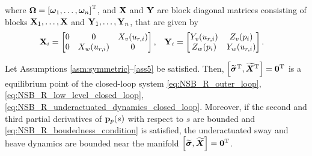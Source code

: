 where $\bm{\Omega} = \left[\bm{\omega}_1, \ldots, \bm{\omega}_n\right]^{\mathrm{T}}$, and $\mathbf{X}$ and $\mathbf{Y}$ are block diagonal matrices consisting of blocks $\mathbf{X}_1, \ldots, \mathbf{X}$ and $\mathbf{Y}_1, \ldots, \mathbf{Y}_n$, that are given by 
\begin{align}
    \mathbf{X}_i &= 
    \begin{bmatrix}
        0 & 0 & X_v(u_{r, i}) \\
        0 & X_w(u_{r, i}) & 0
    \end{bmatrix}, &
    \mathbf{Y}_i &=
    \begin{bmatrix}
        Y_v(u_{r,i}) & Z_v(p_i) \\
        Z_w(p_i) & Y_w(u_{r, i})
    \end{bmatrix}.
\end{align}


\begin{theorem} \label{thm1}
    Let Assumptions \ref{asm:symmetric}--\ref{ass5} be satisfied.
    Then, $\left[\widetilde{\bm{\sigma}}^{\mathrm{T}}, \widetilde{\bm{X}}^{\mathrm{T}}\right] = \mathbf{0}^{\mathrm{T}}$ is a  equilibrium point of the closed-loop system \eqref{eq:NSB_R_outer_loop}, \eqref{eq:NSB_R_low_level_closed_loop}, \eqref{eq:NSB_R_underactuated_dynamics_closed_loop}.
    Moreover, if the second and third partial derivatives of $\mathbf{p}_p(s)$ with respect to $s$ are bounded and \eqref{eq:NSB_R_boudedness_condition} is satisfied, the underactuated sway and heave dynamics are bounded near the manifold $\left[\widetilde{\bm{\sigma}}, \widetilde{\bm{X}}\right] = \mathbf{0}^{\mathrm{T}}$.
\end{theorem}

